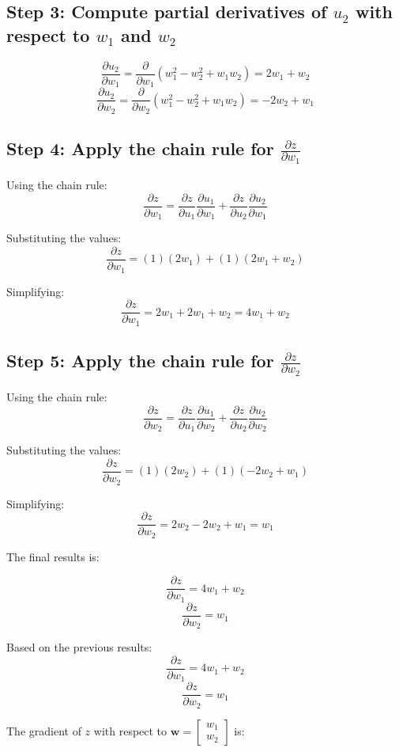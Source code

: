 \documentclass{tufte-handout}
\begin{document}
\subsection*{Step 3: Compute partial derivatives of $u_2$ with respect to $w_1$ and $w_2$}

\[
\frac{\partial u_2}{\partial w_1} = \frac{\partial}{\partial w_1}(w_1^2 - w_2^2 + w_1 w_2) = 2w_1 + w_2
\]
\[
\frac{\partial u_2}{\partial w_2} = \frac{\partial}{\partial w_2}(w_1^2 - w_2^2 + w_1 w_2) = -2w_2 + w_1
\]

\subsection*{Step 4: Apply the chain rule for $\frac{\partial z}{\partial w_1}$}

Using the chain rule:
\[
\frac{\partial z}{\partial w_1} = \frac{\partial z}{\partial u_1}\frac{\partial u_1}{\partial w_1} + \frac{\partial z}{\partial u_2}\frac{\partial u_2}{\partial w_1}
\]

Substituting the values:
\[
\frac{\partial z}{\partial w_1} = (1)(2w_1) + (1)(2w_1 + w_2)
\]

Simplifying:
\[
\frac{\partial z}{\partial w_1} = 2w_1 + 2w_1 + w_2 = 4w_1 + w_2
\]

\subsection*{Step 5: Apply the chain rule for $\frac{\partial z}{\partial w_2}$}

Using the chain rule:
\[
\frac{\partial z}{\partial w_2} = \frac{\partial z}{\partial u_1}\frac{\partial u_1}{\partial w_2} + \frac{\partial z}{\partial u_2}\frac{\partial u_2}{\partial w_2}
\]

Substituting the values:
\[
\frac{\partial z}{\partial w_2} = (1)(2w_2) + (1)(-2w_2 + w_1)
\]

Simplifying:
\[
\frac{\partial z}{\partial w_2} = 2w_2 - 2w_2 + w_1 = w_1
\]

The final results is:

\[
\boxed{\frac{\partial z}{\partial w_1} = 4w_1 + w_2}
\]
\[
\boxed{\frac{\partial z}{\partial w_2} = w_1}
\]


Based on the previous results:
\[
\frac{\partial z}{\partial w_1} = 4w_1 + w_2
\]
\[
\frac{\partial z}{\partial w_2} = w_1
\]

The gradient of $z$ with respect to $\mathbf{w} = \begin{bmatrix} w_1 \\ w_2 \end{bmatrix}$ is:
\end{document}
